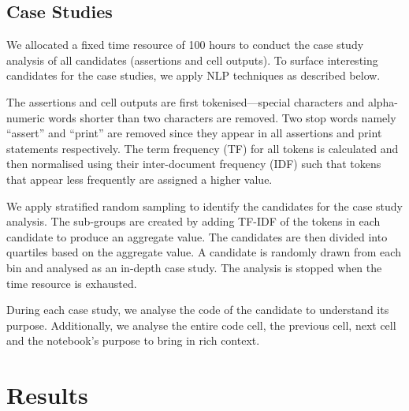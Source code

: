 \subsection{Case Studies}


We allocated a fixed time resource of 100 hours to conduct the case study analysis of all candidates (assertions and cell outputs). To surface interesting candidates for the case studies, we apply NLP techniques as described below.


The assertions and cell outputs are first tokenised---special characters and alpha-numeric words shorter than two characters are removed. Two stop words namely ``assert'' and ``print'' are removed since they appear in all assertions and print statements respectively. The term frequency (TF) for all tokens is calculated and then normalised using their inter-document frequency (IDF) such that tokens that appear less frequently are assigned a higher value.

We apply stratified random sampling to identify the candidates for the case study analysis. The sub-groups are created by adding TF-IDF of the tokens in each candidate to produce an aggregate value. The candidates are then divided into quartiles based on the aggregate value. A candidate is randomly drawn from each bin and analysed as an in-depth case study. The analysis is stopped when the time resource is exhausted.

During each case study, we analyse the code of the candidate to understand its purpose. Additionally, we analyse the entire code cell, the previous cell, next cell and the notebook's purpose to bring in rich context.

\section{Results}


